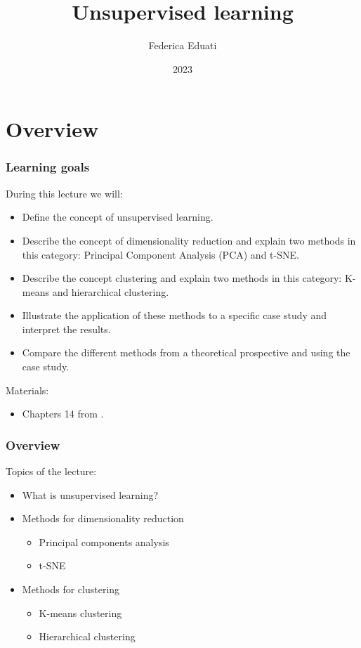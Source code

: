 \documentclass[notes]{beamer}          %
\title{Unsupervised learning}
\author{Federica Eduati}
\institute{Eindhoven University of Technology

Department of Biomedical Engineering}
\date{2023}
\begin{document}
 
\frame{\titlepage}
 
\section{Overview}

\begin{frame}
\frametitle{Learning goals}
During this lecture we will:
\begin{itemize}
    \item Define the concept of unsupervised learning.
    \item Describe the concept of dimensionality reduction and explain two methods in this category: Principal Component Analysis (PCA) and t-SNE.
    \item Describe the concept clustering and explain two methods in this category: K-means and hierarchical clustering.
    \item Illustrate the application of these methods to a specific case study and interpret the results.
    \item Compare the different methods from a theoretical prospective and using the case study.
\end{itemize}

\vspace{5mm} 

Materials: 
\begin{itemize}
    \item Chapters 14 from \cite{elements}.
\end{itemize}

\end{frame}


\begin{frame}
\frametitle{Overview}
Topics of the lecture:
\begin{itemize}
    \item What is unsupervised learning?
    \item Methods for dimensionality reduction
    \begin{itemize}
    		\item Principal components analysis
    		\item t-SNE
    \end{itemize}
    \item Methods for clustering
    \begin{itemize}
    		\item K-means clustering
    		\item Hierarchical clustering
    	\end{itemize}
\end{itemize}

\vspace{5mm} 


\end{frame}
\end{document}
